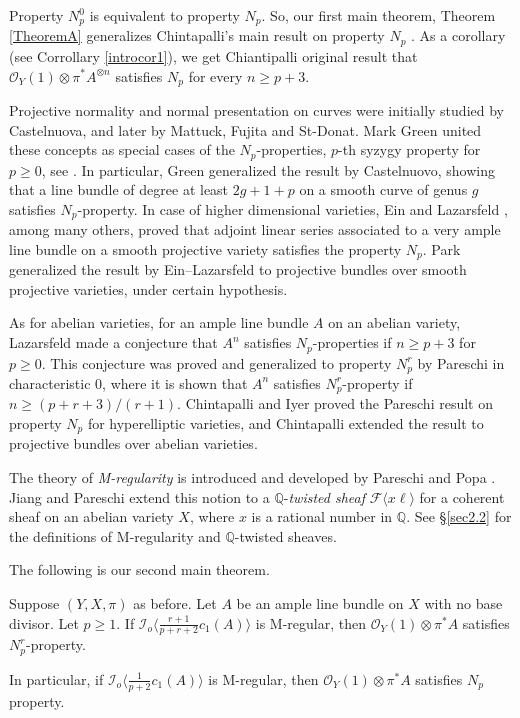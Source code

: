 \documentclass[11pt,letter]{amsart}
\numberwithin{equation}{section}
\begin{document}
  
Property $N_p^0$ is equivalent to property $N_p$. So, our first main theorem, Theorem \ref{TheoremA} generalizes Chintapalli's main result on property $N_p$ \cite[Theorem 1.2]{Chi19}. As a corollary (see Corrollary \ref{introcor1}), we get Chiantipalli original result that $\mathcal{O}_Y(1)\otimes\pi^* A^{\otimes n}$ satisfies $N_p$ for every $n\geq p+3$.
    
    
  
Projective normality and normal presentation on curves were initially studied by Castelnuova, and later by Mattuck, Fujita and St-Donat. Mark Green united these concepts as special cases of the $N_p$-properties, $p$-th syzygy property for $p\geq 0$,   see \cite{green1984koszul,GreenII,GreenIII}. In particular, Green generalized the result by Castelnuovo, showing that a line bundle of degree at least $2g+1+p$ on a smooth curve of genus $g$ satisfies $N_p$-property. In case of higher dimensional varieties, Ein and Lazarsfeld \cite{EL}, among many others, proved that adjoint linear series associated to a very ample line bundle on a smooth projective variety satisfies the property $N_p$. Park \cite{Park} generalized the result by Ein--Lazarsfeld to projective bundles over smooth projective varieties, under certain hypothesis.
  
  As for abelian varieties, for an ample line bundle $A$ on an abelian variety,  Lazarsfeld made a conjecture that $A^n$ satisfies $N_p$-properties if $n\geq p+3$ for $p\geq 0$. This conjecture was proved and generalized to property $N_p^r$ by Pareschi \cite{pareschi2000syzygies} in characteristic $0$, where it is shown that $A^n$ satisfies $N_p^r$-property if $n\geq (p+r+3)/(r+1)$. Chintapalli and Iyer \cite{ChiIyer} proved the Pareschi result on property $N_p$ for hyperelliptic varieties, and Chintapalli \cite[Theorem 1.2]{Chi19} extended the result to projective bundles over abelian varieties. %

  
 The theory of {\it M-regularity} is introduced and developed by Pareschi and Popa \cite{PP03,PP04,PP11}. Jiang and Pareschi \cite{JiPa2020} extend this notion to a $\mathbb{Q}$-{\it twisted sheaf} $\mathcal{F}\langle x\ell\rangle$ for a coherent sheaf on an abelian variety $X$, where $x$ is a rational number in $\mathbb{Q}$. See \S\ref{sec2.2} for the definitions of M-regularity and $\mathbb{Q}$-twisted sheaves. %
  
  The following is our second main theorem.  
\begin{introthm}\label{TheoremC}
Suppose $(Y,X,\pi)$ as before. 
Let $A$ be an ample line bundle on $X$ with no base divisor. Let $p\geq 1$.
 If $\mathcal{I}_o\langle \frac{r+1}{p+r+2}c_1(A)\rangle$ is M-regular, then $\mathcal{O}_Y(1)\otimes\pi^*A$ satisfies $N_p^r$-property.  
 
 In particular, if $\mathcal{I}_o\langle \frac{1}{p+2}c_1(A)\rangle$ is M-regular, then $\mathcal{O}_Y(1)\otimes\pi^*A$ satisfies $N_p$ property. 
\end{introthm}
\end{document}
